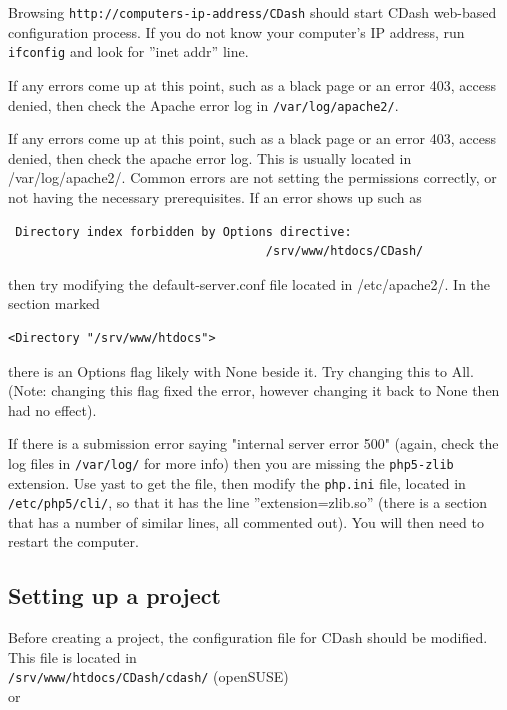 Browsing \verb!http://computers-ip-address/CDash! should start CDash web-based configuration process. If you do not know your computer's IP address, run \verb!ifconfig! and look for ''inet addr'' line.

If any errors come up at this point, such as a black page or an error 403, access denied, then check the Apache error log in \verb!/var/log/apache2/!.

If any errors come up at this point, such as a black page or an error 403, access denied, then check the apache error log. This is usually located in /var/log/apache2/. Common errors are not setting the permissions correctly, or not having the necessary prerequisites. If an error shows up such as
\small \begin{lstlisting}
 Directory index forbidden by Options directive:
                                    /srv/www/htdocs/CDash/
\end{lstlisting}\normalsize
then try modifying the default-server.conf file located in /etc/apache2/. In the section marked 
\small \begin{lstlisting}
<Directory "/srv/www/htdocs"> 
\end{lstlisting}\normalsize
there is an Options flag likely with None beside it. Try changing this to All. (Note: changing this flag fixed the error, however changing it back to None then had no effect).

If there is a submission error saying "internal server error 500" (again, check the log files in \verb!/var/log/! for more info) then you are missing the \verb!php5-zlib! extension. Use yast to get the file, then modify the \verb!php.ini! file, located in \verb!/etc/php5/cli/!, so that it has the line ''extension=zlib.so'' (there is a section that has a number of similar lines, all commented out). You will then need to restart the computer. 

\subsection{Setting up a project} \label{sec:Setting up a project}

Before creating a project, the configuration file for CDash should be modified. This file is located in \\

\noindent \verb!/srv/www/htdocs/CDash/cdash/! (openSUSE)\\

\noindent or\\

